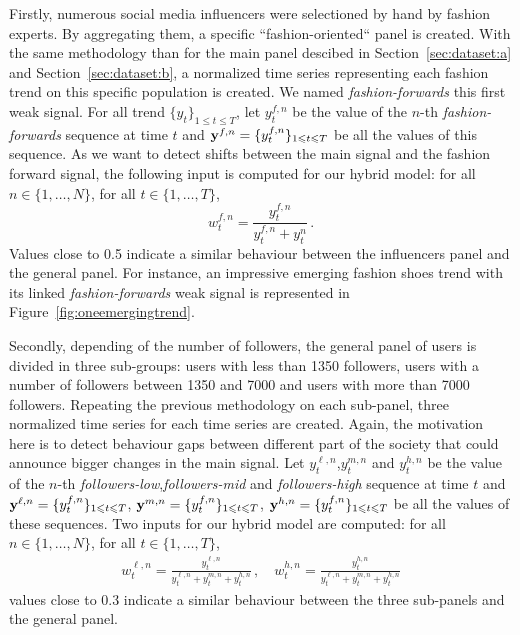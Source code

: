 \documentclass{article} %
\newcommand{\ts}{y}
\newcommand{\fullts}{{\bf \ts}}
\newcommand{\ws}{w}
\begin{document}
Firstly, numerous social media influencers were selectioned by hand by fashion experts. By aggregating them, a specific ``fashion-oriented`` panel is created. With the same methodology than for the main panel descibed in Section~\ref{sec:dataset:a} and Section~\ref{sec:dataset:b}, a normalized time series representing each fashion trend on this specific population is created. We named \textit{fashion-forwards} this first weak signal.  For all trend $\{y_t\}_{1\leqslant t\leqslant T}$, let $\ts_t^{f,n}$ be the value of the $n$-th \textit{fashion-forwards} sequence at time $t$ and  $\fullts^{f,n} = \{\ts_t^{f,n}\}_{1\leqslant t \leqslant T}$ be all the values of this sequence.
As we want to detect shifts between the main signal and the fashion forward signal, the following input is computed for our hybrid model:  for all $n \in \{1,\ldots,N\}$, for all $t \in \{1,\ldots,T\}$,
$$
\ws^{f,n}_{t} = \frac{\ts_t^{f,n}}{\ts_t^{f,n}+\ts_t^{n}}\,.
$$
Values close to 0.5 indicate a similar behaviour between the influencers panel and the general panel. For instance, an impressive emerging fashion shoes trend with its linked \textit{fashion-forwards} weak signal is represented in Figure~\ref{fig:oneemergingtrend}. 


Secondly, depending of the number of followers, the general panel of users is divided in three sub-groups: users with less than 1350 followers, users with a number of followers between 1350 and 7000 and users with more than 7000 followers. Repeating the previous methodology on each sub-panel, three normalized time series for each time series are created.  Again, the motivation here is to detect behaviour gaps between different part of the society that could announce bigger changes in the main signal. Let $\ts_t^{\ell,n}$,$\ts_t^{m,n}$ and $\ts_t^{h,n}$ be the value of the $n$-th \textit{followers-low},\textit{followers-mid} and \textit{followers-high} sequence at time $t$ and  $\fullts^{\ell,n} = \{\ts_t^{f,n}\}_{1\leqslant t \leqslant T}$, $\fullts^{m,n} = \{\ts_t^{f,n}\}_{1\leqslant t \leqslant T}$, $\fullts^{h,n} = \{\ts_t^{f,n}\}_{1\leqslant t \leqslant T}$ be all the values of these sequences. Two inputs for our hybrid model are computed: for all $n \in \{1,\ldots,N\}$, for all $t \in \{1,\ldots,T\}$,
\begin{align*}
\ws^{\ell,n}_{t} = \frac{\ts_t^{\ell,n}}{\ts_t^{\ell,n}+\ts_t^{m,n}+\ts_t^{h,n}}\,,\quad \ws^{h,n}_{t} = \frac{\ts_t^{h,n}}{\ts_t^{\ell,n}+\ts_t^{m,n}+\ts_t^{h,n}}
\end{align*}  
values close to 0.3 indicate a similar behaviour between the three sub-panels and the general panel.
\end{document}
